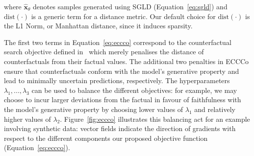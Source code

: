 \documentclass{article}
\begin{document}
where $\hat{\mathbf{x}}_{\theta}$ denotes samples generated using SGLD (Equation~\ref{eq:sgld}) and $\text{dist}(\cdot)$ is a generic term for a distance metric. Our default choice for $\text{dist}(\cdot)$ is the L1 Norm, or Manhattan distance, since it induces sparsity.

The first two terms in Equation~\ref{eq:eccco} correspond to the counterfactual search objective defined in~\citet{wachter2017counterfactual} which merely penalises the distance of counterfactuals from their factual values. The additional two penalties in ECCCo ensure that counterfactuals conform with the model's generative property and lead to minimally uncertain predictions, respectively. The hyperparameters $\lambda_1, ..., \lambda_3$ can be used to balance the different objectives: for example, we may choose to incur larger deviations from the factual in favour of faithfulness with the model's generative property by choosing lower values of $\lambda_1$ and relatively higher values of $\lambda_2$. Figure~\ref{fig:eccco} illustrates this balancing act for an example involving synthetic data: vector fields indicate the direction of gradients with respect to the different components our proposed objective function (Equation~\ref{eq:eccco}).

\medskip

\renewcommand{\algorithmicrequire}{\textbf{Input:}}
\renewcommand{\algorithmicensure}{\textbf{Output:}}
  
\end{document}
